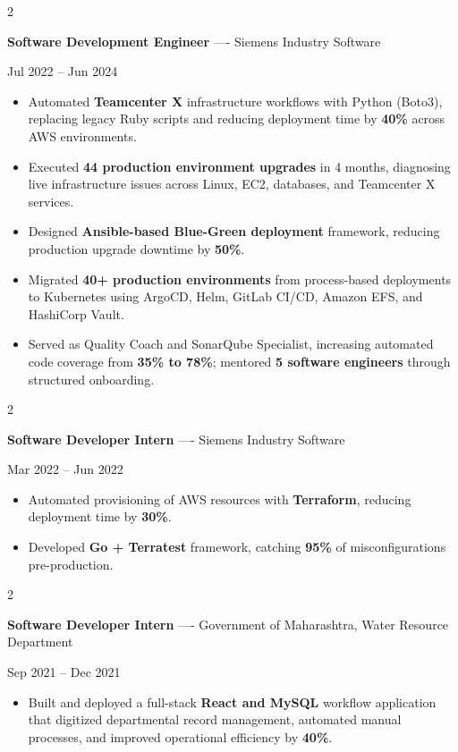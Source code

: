 \documentclass[10pt, letterpaper]{article}
\newenvironment{highlights}{
    \begin{itemize}[
        topsep=0.10 cm,
        parsep=0.06 cm,
        partopsep=0pt,
        itemsep=0.06 cm,
        leftmargin=12pt
    ]
}{
    \end{itemize}
}
\newenvironment{twocolentry}[2][]{
    \onecolentry
    \def\secondColumn{#2}
    \setcolumnwidth{\fill, 4.5 cm}
    \begin{paracol}{2}
}{
    \switchcolumn \raggedleft \secondColumn
    \end{paracol}
    \endonecolentry
}
\begin{document}
\vspace{0.15 cm}

\begin{twocolentry}{Jul 2022 -- Jun 2024}
\textbf{Software Development Engineer} ---- Siemens Industry Software
\end{twocolentry}
\begin{highlights}
  \item Automated \textbf{Teamcenter X} infrastructure workflows with Python (Boto3), replacing legacy Ruby scripts and reducing deployment time by \textbf{40\%} across AWS environments.
  \item Executed \textbf{44 production environment upgrades} in 4 months, diagnosing live infrastructure issues across Linux, EC2, databases, and Teamcenter X services.
  \item Designed \textbf{Ansible-based Blue-Green deployment} framework, reducing production upgrade downtime by \textbf{50\%}.
  \item Migrated \textbf{40+ production environments} from process-based deployments to Kubernetes using ArgoCD, Helm, GitLab CI/CD, Amazon EFS, and HashiCorp Vault.
  \item Served as Quality Coach and SonarQube Specialist, increasing automated code coverage from \textbf{35\% to 78\%}; mentored \textbf{5 software engineers} through structured onboarding.
\end{highlights}

\vspace{0.15 cm}

\begin{twocolentry}{Mar 2022 -- Jun 2022}
\textbf{Software Developer Intern} ---- Siemens Industry Software
\end{twocolentry}
\begin{highlights}
  \item Automated provisioning of AWS resources with \textbf{Terraform}, reducing deployment time by \textbf{30\%}.
  \item Developed \textbf{Go + Terratest} framework, catching \textbf{95\%} of misconfigurations pre-production.
\end{highlights}

\vspace{0.15 cm}

\begin{twocolentry}{Sep 2021 -- Dec 2021}
\textbf{Software Developer Intern} ---- Government of Maharashtra, Water Resource Department
\end{twocolentry}
\begin{highlights}
  \item Built and deployed a full-stack \textbf{React and MySQL} workflow application that digitized departmental record management, automated manual processes, and improved operational efficiency by \textbf{40\%}.
\end{highlights}
\end{document}
